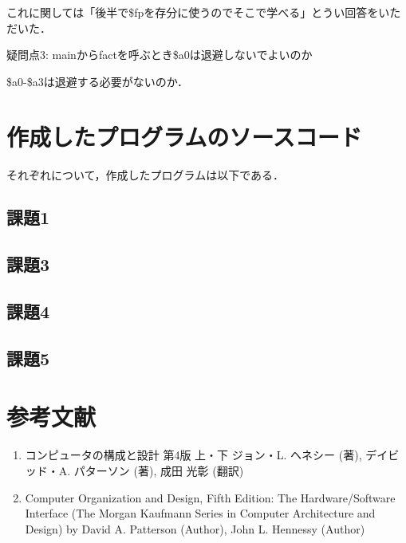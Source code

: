 \documentclass[a4j]{jarticle}
\begin{document}
これに関しては「後半で\$fpを存分に使うのでそこで学べる」とうい回答をいただいた．

疑問点3: mainからfactを呼ぶとき\$a0は退避しないでよいのか

\$a0-\$a3は退避する必要がないのか．


\newpage

%
%

\section{作成したプログラムのソースコード}

それぞれについて，作成したプログラムは以下である．

\subsection{課題1}





\subsection{課題3}



\subsection{課題4}



\subsection{課題5}




%
%

\section{参考文献}

\begin{enumerate}
\item コンピュータの構成と設計 第4版 上・下 ジョン・L. ヘネシー (著), デイビッド・A. パターソン (著), 成田 光彰 (翻訳)
\item Computer Organization and Design, Fifth Edition: The Hardware/Software Interface (The Morgan Kaufmann Series in Computer Architecture and Design) by David A. Patterson (Author), John L. Hennessy  (Author)
\end{enumerate}
\end{document}
